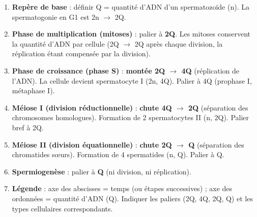 \documentclass[11pt]{article}
\begin{document}
\begin{methode}[Tracer et interpréter la courbe Q = f(t) pour la spermatogenèse]
\begin{enumerate}
    \item \textbf{Repère de base} : définir Q = quantité d'ADN d'un spermatozoïde (n). La spermatogonie en G1 est 2n $\rightarrow$ 2Q.
    \item \textbf{Phase de multiplication (mitoses)} : palier à \textbf{2Q}. Les mitoses conservent la quantité d'ADN par cellule (2Q $\rightarrow$ 2Q après chaque division, la réplication étant compensée par la division).
    \item \textbf{Phase de croissance (phase S)} : \textbf{montée 2Q $\rightarrow$ 4Q} (réplication de l'ADN). La cellule devient spermatocyte I (2n, 4Q). Palier à 4Q (prophase I, métaphase I).
    \item \textbf{Méiose I (division réductionnelle)} : \textbf{chute 4Q $\rightarrow$ 2Q} (séparation des chromosomes homologues). Formation de 2 spermatocytes II (n, 2Q). Palier bref à 2Q.
    \item \textbf{Méiose II (division équationnelle)} : \textbf{chute 2Q $\rightarrow$ Q} (séparation des chromatides sœurs). Formation de 4 spermatides (n, Q). Palier à Q.
    \item \textbf{Spermiogenèse} : palier à \textbf{Q} (ni division, ni réplication).
    \item \textbf{Légende} : axe des abscisses = temps (ou étapes successives) ; axe des ordonnées = quantité d'ADN (Q). Indiquer les paliers (2Q, 4Q, 2Q, Q) et les types cellulaires correspondants.
\end{enumerate}
\end{methode}
\end{document}
